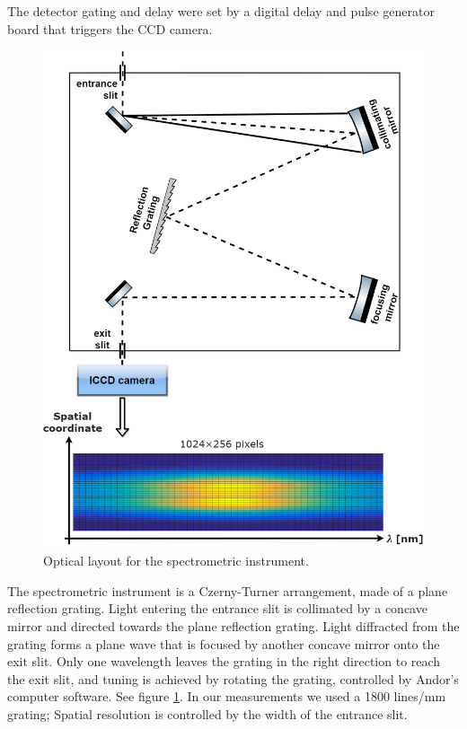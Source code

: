 \documentclass[justified,nofonts,nobib,openany]{tufte-book}
\begin{document}
The detector gating and delay were set by a digital delay and pulse generator board that triggers the CCD camera.

\begin{figure}
\centering
\includegraphics[width=\textwidth]{./figures/spectro/spectrometer.PNG}
\caption{Optical layout for the spectrometric instrument.}
\label{fig:spectrometer}
\end{figure}
The spectrometric instrument is a Czerny-Turner arrangement, made of a plane reflection grating. Light entering the entrance slit is collimated by a concave mirror and directed towards the plane reflection grating. Light diffracted from the grating forms a plane wave that is focused by another concave mirror onto the exit slit. Only one wavelength leaves the grating in the right direction to reach the exit slit, and tuning is achieved by rotating the grating, controlled by Andor's computer software. See figure \ref{fig:spectrometer}. In our measurements we used a 1800 lines/mm grating; Spatial resolution is controlled by the width of the entrance slit.
	
\end{document}
